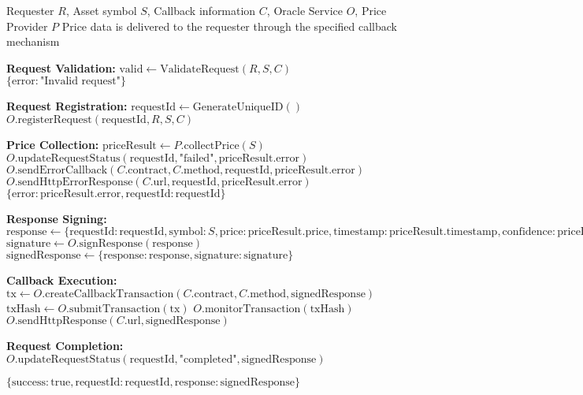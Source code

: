 \begin{protocol}
\label{prot:oracle-price-request}
\begin{algorithmic}[1]
\Require Requester $R$, Asset symbol $S$, Callback information $C$, Oracle Service $O$, Price Provider $P$
\Ensure Price data is delivered to the requester through the specified callback mechanism

\State \textbf{Request Validation:}
\State $\text{valid} \gets \text{ValidateRequest}(R, S, C)$
    \State \Return $\{\text{error}: \text{"Invalid request"}\}$
\EndIf

\State \textbf{Request Registration:}
\State $\text{requestId} \gets \text{GenerateUniqueID}()$
\State $O.\text{registerRequest}(\text{requestId}, R, S, C)$

\State \textbf{Price Collection:}
\State $\text{priceResult} \gets P.\text{collectPrice}(S)$
    \State $O.\text{updateRequestStatus}(\text{requestId}, \text{"failed"}, \text{priceResult}.\text{error})$
        \State $O.\text{sendErrorCallback}(C.\text{contract}, C.\text{method}, \text{requestId}, \text{priceResult}.\text{error})$
        \State $O.\text{sendHttpErrorResponse}(C.\text{url}, \text{requestId}, \text{priceResult}.\text{error})$
    \EndIf
    \State \Return $\{\text{error}: \text{priceResult}.\text{error}, \text{requestId}: \text{requestId}\}$
\EndIf

\State \textbf{Response Signing:}
\State $\text{response} \gets \{\text{requestId}: \text{requestId}, \text{symbol}: S, \text{price}: \text{priceResult}.\text{price}, \text{timestamp}: \text{priceResult}.\text{timestamp}, \text{confidence}: \text{priceResult}.\text{confidence}\}$
\State $\text{signature} \gets O.\text{signResponse}(\text{response})$
\State $\text{signedResponse} \gets \{\text{response}: \text{response}, \text{signature}: \text{signature}\}$

\State \textbf{Callback Execution:}
    \State $\text{tx} \gets O.\text{createCallbackTransaction}(C.\text{contract}, C.\text{method}, \text{signedResponse})$
    \State $\text{txHash} \gets O.\text{submitTransaction}(\text{tx})$
    \State $O.\text{monitorTransaction}(\text{txHash})$
    \State $O.\text{sendHttpResponse}(C.\text{url}, \text{signedResponse})$
\EndIf

\State \textbf{Request Completion:}
\State $O.\text{updateRequestStatus}(\text{requestId}, \text{"completed"}, \text{signedResponse})$

\State \Return $\{\text{success}: \text{true}, \text{requestId}: \text{requestId}, \text{response}: \text{signedResponse}\}$
\end{algorithmic}
\end{protocol}

